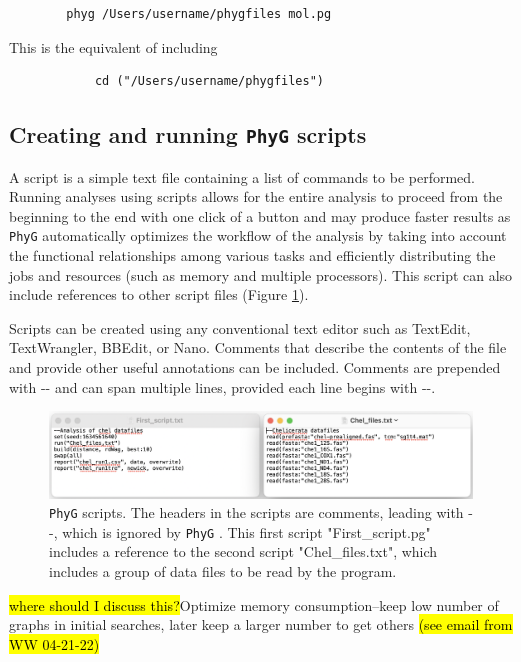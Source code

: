 \documentclass[11pt]{book}
\newcommand{\phyg}{\texttt{PhyG} }
\begin{document}
{{		\begin{verbatim}
   		phyg /Users/username/phygfiles mol.pg
		\end{verbatim}
		
		\noindent This is the equivalent of including
		
		\begin{verbatim}
     		cd ("/Users/username/phygfiles")
		\end{verbatim}
			
		\subsection{Creating and running \phyg scripts}
		A script is a simple text file containing a list of commands to be performed.  Running 
		analyses using scripts allows for the entire analysis to proceed from the beginning to 
		the end with one click of a button and may produce faster results  as \phyg automatically 
		optimizes the workflow of the analysis by taking into account the functional relationships 
		among various tasks and efficiently distributing the jobs and resources (such as memory 
		and multiple processors). This script 	can also include references to other script files 
		(Figure \ref{firstscript}).
		
		Scripts can be created using any conventional text editor such as TextEdit, TextWrangler, 
		BBEdit, or Nano. Comments that describe the contents of the file and provide other useful 
		annotations can be included. Comments  are prepended with -{}- and can span multiple lines, 
		provided each line begins with -{}-. 

	\begin{figure}
	\centering
	\includegraphics[width=\textwidth]{First_run.jpg}
	\caption{\phyg scripts. The headers in the scripts are comments, leading with -{}-, which is 
	ignored by \phyg. This first script "First\_script.pg"  includes a reference to the second script
	"Chel\_files.txt", which includes a group of data files to be read by the program.}
	\label{firstscript}
	\end{figure}


\hl{where should I discuss this?}Optimize memory consumption--keep low number of graphs in initial searches, later keep a larger
	number to get others \hl{(see email from WW 04-21-22)}

}}
\end{document}
